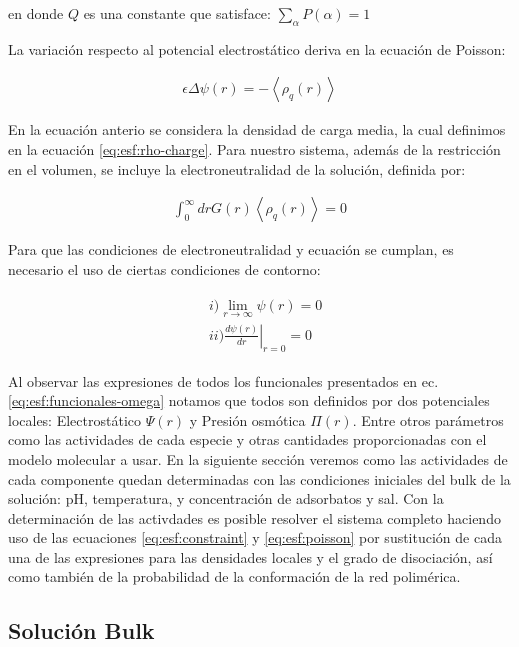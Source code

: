 	\noindent en donde  $Q$ es una constante que satisface: $\sum_\alpha P(\alpha) = 1$
	
	La variaci\'on respecto al potencial electrost\'atico deriva en la ecuaci\'on de Poisson:
	
	\begin{align}
		\epsilon\Delta\psi(r) = -\left<\rho_q(r)\right>
		\label{eq:esf:poisson}
	\end{align}
	
	En la ecuaci\'on anterio se considera la densidad de carga media, la cual definimos en la ecuaci\'on  \ref{eq:esf:rho-charge}.  Para nuestro sistema, adem\'as de la restricci\'on en el volumen, se incluye la electroneutralidad de la soluci\'on, definida por:

	\begin{align}
		\int_0^\infty{drG(r) \left<\rho_q(r)\right>} = 0
	\end{align}
	
	
Para que las condiciones de electroneutralidad y ecuaci\'on se cumplan, es necesario el uso de ciertas condiciones de contorno:	

	\begin{align}
		\begin{aligned}
			&i)  \lim_{r\to\infty}\psi(r) = 0 \\
			&ii) \left.\frac{d\psi(r)}{dr}\right|_{r=0} = 0
			\label{eq:esf:contorno}
		\end{aligned}
	\end{align}
	
Al observar las expresiones de todos los funcionales presentados en ec. \ref{eq:esf:funcionales-omega}
notamos que  todos son definidos por dos potenciales locales: Electrost\'atico $\Psi(r)$ y Presi\'on osm\'otica $\Pi(r)$. Entre otros par\'ametros como las actividades de cada especie y otras cantidades proporcionadas con el modelo molecular a usar.
En la siguiente secci\'on veremos como las actividades de cada componente quedan determinadas con las condiciones iniciales del bulk de la soluci\'on: pH, temperatura, y concentraci\'on de adsorbatos y sal.
Con la determinaci\'on de las activdades es posible resolver el sistema completo haciendo uso de las ecuaciones \ref{eq:esf:constraint} y \ref{eq:esf:poisson} por sustituci\'on de cada una de las expresiones para las densidades locales y el grado de disociaci\'on, as\'i como tambi\'en de la probabilidad de la conformaci\'on de la red polim\'erica. 

\subsection{Soluci\'on Bulk}\label{sec:esf:bulk}

